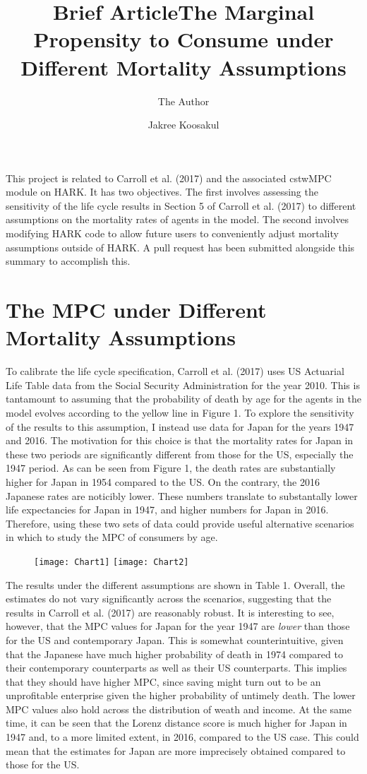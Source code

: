 \documentclass[11pt]{article}
\title{Brief Article}
\author{The Author}
\author{Jakree Koosakul}
\title{The Marginal Propensity to Consume under Different Mortality Assumptions}
\begin{document}
\maketitle


This project is related to Carroll et al. (2017) and the associated cstwMPC module on HARK. It has two objectives. The first involves assessing the sensitivity of the life cycle results in Section 5 of Carroll et al. (2017) to different assumptions on the mortality rates of agents in the model. The second involves modifying HARK code to allow future users to conveniently adjust mortality assumptions outside of HARK. A pull request has been submitted alongside this summary to accomplish this. 

\section{The MPC under Different Mortality Assumptions}

To calibrate the life cycle specification, Carroll et al. (2017) uses US Actuarial Life Table data from the Social Security Administration for the year 2010. This is tantamount to assuming that the probability of death by age for the agents in the model evolves according to the yellow line in Figure 1. To explore the sensitivity of the results to this assumption, I instead use data for Japan for the years 1947 and 2016. The motivation for this choice is that the mortality rates for Japan in these two periods are significantly different from those for the US, especially the 1947 period. As can be seen from Figure 1, the death rates are substantially higher for Japan in 1954 compared to the US. On the contrary, the 2016 Japanese rates are noticibly lower. These numbers translate to substantally lower life expectancies for Japan in 1947, and higher numbers for Japan in 2016. Therefore, using these two sets of data could provide useful alternative scenarios in which to study the MPC of consumers by age.

\begin{figure}
  \texttt{[image: Chart1]}
  \texttt{[image: Chart2]}
\end{figure}    

The results under the different assumptions are shown in Table 1. Overall, the estimates do not vary significantly across the scenarios, suggesting that the results in Carroll et al. (2017) are reasonably robust. It is interesting to see, however, that the MPC values for Japan for the year 1947 are \textit{lower} than those for the US and contemporary Japan. This is somewhat counterintuitive, given that the Japanese have much higher probability of death in 1974 compared to their contemporary counterparts as well as their US counterparts. This implies that they should have higher MPC, since saving might turn out to be an unprofitable enterprise given the higher probability of untimely death. The lower MPC values also hold across the distribution of weath and income. At the same time, it can be seen that the Lorenz distance score is much higher for Japan in 1947 and, to a more limited extent, in 2016, compared to the US case. This could mean that the estimates for Japan are more imprecisely obtained compared to those for the US.  
\end{document}
